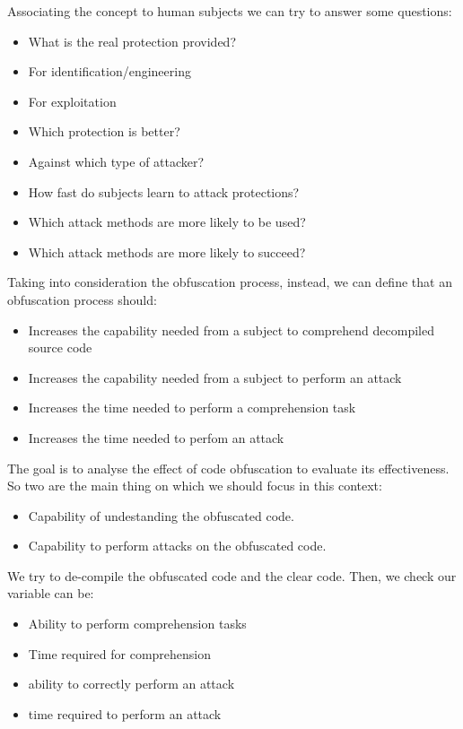 Associating the concept to human subjects we can try to answer some questions:

\begin{itemize}
    \item What is the real protection provided?
    \item For identification/engineering
    \item For exploitation
    \item Which protection is better?
    \item Against which type of attacker?
    \item How fast do subjects learn to attack protections?
    \item Which attack methods are more likely to be used?
    \item Which attack methods are more likely to succeed?
\end{itemize}

Taking into consideration the obfuscation process, instead, we can define that an obfuscation process should: 

\begin{itemize}
    \item Increases the capability needed from a subject to comprehend decompiled source code
    \item Increases the capability needed from a subject to perform an attack
    \item Increases the time needed to perform a comprehension task
    \item Increases the time needed to perfom an attack
\end{itemize}

The goal is to analyse the effect of code obfuscation to evaluate its effectiveness.
So two are the main thing on which we should focus in this context:

\begin{itemize}
    \item Capability of undestanding the obfuscated code.
    \item Capability to perform attacks on the obfuscated code.
\end{itemize}

We try to de-compile the obfuscated code and the clear code. Then, we check our variable can be: 
\begin{itemize}
    \item Ability to perform comprehension tasks
    \item Time required for comprehension
    \item ability to correctly perform an attack 
    \item time required to perform an attack
\end{itemize}

